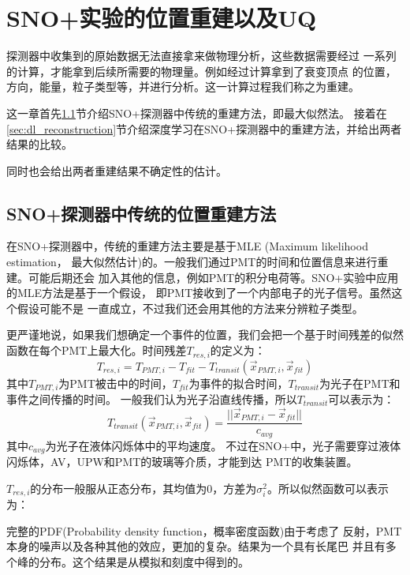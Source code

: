 \chapter{SNO+实验的位置重建以及UQ}

探测器中收集到的原始数据无法直接拿来做物理分析，这些数据需要经过
一系列的计算，才能拿到后续所需要的物理量。例如经过计算拿到了衰变顶点
的位置，方向，能量，粒子类型等，并进行分析。这一计算过程我们称之为重建。

这一章首先\ref{sec:classical_reconstruction}节介绍SNO+探测器中传统的重建方法，即最大似然法。
接着在\ref{sec:dl_reconstruction}节介绍深度学习在SNO+探测器中的重建方法，并给出两者结果的比较。

同时也会给出两者重建结果不确定性的估计。

\section{SNO+探测器中传统的位置重建方法}\label{sec:classical_reconstruction}

在SNO+探测器中，传统的重建方法主要是基于MLE (Maximum likelihood estimation，
最大似然估计)的。一般我们通过PMT的时间和位置信息来进行重建。可能后期还会
加入其他的信息，例如PMT的积分电荷等。SNO+实验中应用的MLE方法是基于一个假设，
即PMT接收到了一个内部电子的光子信号。\cite{anderson2024}虽然这个假设可能不是
一直成立，不过我们还会用其他的方法来分辨粒子类型。

更严谨地说，如果我们想确定一个事件的位置，我们会把一个基于时间残差的似然
函数在每个PMT上最大化。时间残差$T_{res,i}$的定义为：
\begin{equation}
T_{res,i} = T_{PMT,i}-T_{fit}-T_{transit}(\vec{x}_{PMT,i},\vec{x}_{fit})
\label{eq:residual}
\end{equation}
其中$T_{PMT,i}$为PMT被击中的时间，$T_{fit}$为事件的拟合时间，$T_{transit}$为光子在PMT和事件之间传播的时间。
一般我们认为光子沿直线传播，所以$T_{transit}$可以表示为：
\begin{equation}
T_{transit}(\vec{x}_{PMT,i},\vec{x}_{fit}) = \frac{||\vec{x}_{PMT,i}-\vec{x}_{fit}||}{c_{avg}}
\end{equation}
其中$c_{avg}$为光子在液体闪烁体中的平均速度。
不过在SNO+中，光子需要穿过液体闪烁体，AV，UPW和PMT的玻璃等介质，才能到达
PMT的收集装置。

$T_{res,i}$的分布一般服从正态分布，其均值为0，方差为$\sigma_{i}^2$。所以似然函数可以表示为：

完整的PDF(Probability density function，概率密度函数)由于考虑了
反射，PMT本身的噪声以及各种其他的效应，更加的复杂。结果为一个具有长尾巴
并且有多个峰的分布。这个结果是从模拟和刻度中得到的。\cite{anderson2024}


